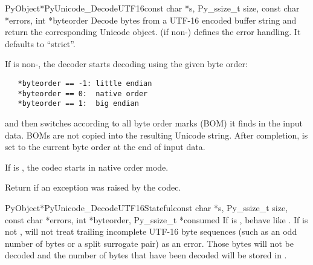 \begin{cfuncdesc}{PyObject*}{PyUnicode_DecodeUTF16}{const char *s,
                                               Py_ssize_t size,
                                               const char *errors,
                                               int *byteorder}
  Decode  bytes from a UTF-16 encoded buffer string and
  return the corresponding Unicode object.   (if
  non-\NULL{}) defines the error handling. It defaults to ``strict''.

  If  is non-\NULL{}, the decoder starts decoding using
  the given byte order:

\begin{verbatim}
   *byteorder == -1: little endian
   *byteorder == 0:  native order
   *byteorder == 1:  big endian
\end{verbatim}

  and then switches according to all byte order marks (BOM) it finds
  in the input data.  BOMs are not copied into the resulting Unicode
  string.  After completion,  is set to the current
  byte order at the end of input data.

  If  is \NULL{}, the codec starts in native order mode.

  Return \NULL{} if an exception was raised by the codec.
\end{cfuncdesc}

\begin{cfuncdesc}{PyObject*}{PyUnicode_DecodeUTF16Stateful}{const char *s,
                                               Py_ssize_t size,
                                               const char *errors,
                                               int *byteorder,
                                               Py_ssize_t *consumed}
  If  is \NULL{}, behave like
  . If  is not \NULL{},
   will not treat trailing incomplete
  UTF-16 byte sequences (such as an odd number of bytes or a split surrogate pair)
  as an error. Those bytes will not be decoded and the number of bytes that
  have been decoded will be stored in .
\end{cfuncdesc}

